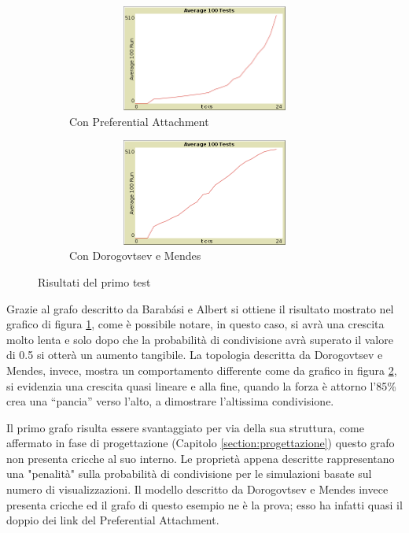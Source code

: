 \begin{figure}[!ht]
  \begin{subfigure}[l]{0.5\textwidth}
    \begin{center}
      \includegraphics[width=1\textwidth, height=35mm]{img/interface-test-1-preferential-attachment-chart.png}
    \end{center}
    \caption{Con Preferential Attachment}
    \label{img:result_test_1_pa}
  \end{subfigure}
  \begin{subfigure}[r]{0.5\textwidth}
    \begin{center}
      \includegraphics[width=1\textwidth, height=35mm]{img/interface-test-1-dorogovtsev-mendes-chart.png}
    \end{center}
    \caption{Con Dorogovtsev e Mendes}
    \label{img:result_test_1_dm}
  \end{subfigure}
 \caption{Risultati del primo test}
 \label{img:results_test_1}
 \vspace*{-10pt}
\end{figure}


Grazie al grafo descritto da Barabási e Albert si ottiene il risultato mostrato nel grafico di figura \ref{img:result_test_1_pa}, 
come è possibile notare, in questo caso, si avrà una crescita molto lenta e solo dopo che la probabilità di condivisione avrà 
superato il valore di 0.5 si otterà un aumento tangibile.
La topologia descritta da Dorogovtsev e Mendes, invece, mostra un comportamento differente come da grafico in figura \ref{img:result_test_1_dm}, 
si evidenzia una crescita quasi lineare e alla fine, quando la forza è attorno l'85\% crea una ``pancia'' verso l'alto, a dimostrare l'altissima 
condivisione.

Il primo grafo risulta essere svantaggiato per via della sua struttura, come affermato  
in fase di progettazione (Capitolo \ref{section:progettazione}) questo grafo non presenta cricche al suo interno.
Le proprietà appena descritte rappresentano una "penalità" sulla probabilità di condivisione per le simulazioni basate sul numero di visualizzazioni. 
Il modello descritto da Dorogovtsev e Mendes invece presenta cricche ed il grafo di questo esempio ne è la prova; 
esso ha infatti quasi il doppio dei link del Preferential Attachment.

